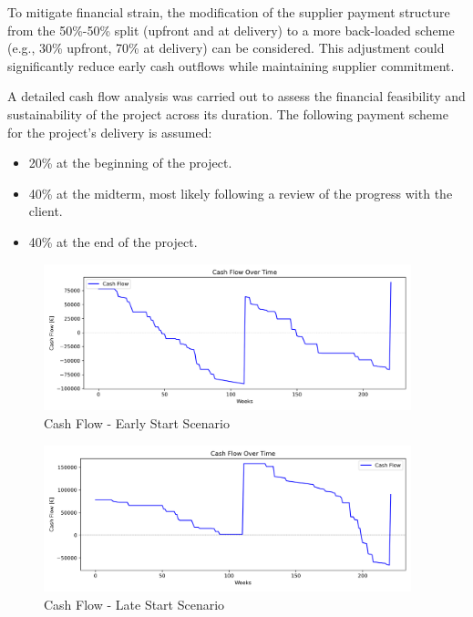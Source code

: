To mitigate financial strain, the modification of the supplier payment structure from the 50\%-50\% split (upfront and at delivery) to a more back-loaded scheme (e.g., 30\% upfront, 70\% at delivery) can be considered.
This adjustment could significantly reduce early cash outflows while maintaining supplier commitment.

A detailed cash flow analysis was carried out to assess the financial feasibility and sustainability of the project across its duration. The following payment scheme for the project's delivery is assumed:
\begin{itemize}
    \item 20\% at the beginning of the project.
    \item 40\% at the midterm, most likely following a review of the progress with the client.
    \item 40\% at the end of the project.
\end{itemize}

\begin{figure}[ht]
    \centering
    \includegraphics[width=0.95\textwidth]{../cash_flow_E.png}
    \caption{Cash Flow - Early Start Scenario}
    \label{fig:cashflow_early}

\end{figure}
\begin{figure}[ht]
    \centering
    \includegraphics[width=0.95\textwidth]{../cash_flow_L.png}
    \caption{Cash Flow - Late Start Scenario}
    \label{fig:cashflow_late}
\end{figure}

